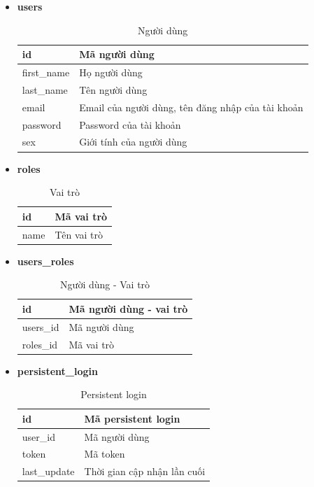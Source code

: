 \begin{itemize}
    \item \textbf{users}
    \begin{table}[H]
        \centering
        \begin{tabular}{|m{3cm}|m{10cm}|}
        \hline 
            id & Mã người dùng\\ \hline
            first\_name & Họ người dùng \\ \hline
            last\_name & Tên người dùng\\ \hline
            email & Email của người dùng, tên đăng nhập của tài khoản \\ \hline
            password & Password của tài khoản\\ \hline
            sex & Giới tính của người dùng\\
        \hline 
        \end{tabular}
        \caption{Người dùng}
        \label{users}
    \end{table}
    
    \newpage
    \item \textbf{roles}
    \begin{table}[H]
        \centering
        \begin{tabular}{|m{3cm}|m{10cm}|}
        \hline 
            id & Mã vai trò\\ \hline
            name & Tên vai trò\\
        \hline 
        \end{tabular}
        \caption{Vai trò}
        \label{roles}
    \end{table}
    
    \item \textbf{users\_roles}
    \begin{table}[H]
        \centering
        \begin{tabular}{|m{3cm}|m{10cm}|}
        \hline 
            id & Mã người dùng - vai trò\\ \hline
            users\_id & Mã người dùng\\ \hline
            roles\_id & Mã vai trò\\
        \hline 
        \end{tabular}
        \caption{Người dùng - Vai trò}
        \label{users_roles}
    \end{table}
    
    \item \textbf{persistent\_login}
    \begin{table}[H]
        \centering
        \begin{tabular}{|m{3cm}|m{10cm}|}
        \hline 
            id & Mã persistent login\\ \hline
            user\_id & Mã người dùng\\ \hline
            token & Mã token\\ \hline
            last\_update & Thời gian cập nhận lần cuối\\
        \hline 
        \end{tabular}
        \caption{Persistent login}
        \label{persistent_login}
    \end{table}
    

\end{itemize}
